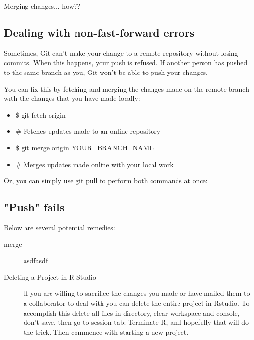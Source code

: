 \documentclass[12pt]{../SOP3_beta}
\begin{document}
\NP Merging changes... how??

\subsection{Dealing with non-fast-forward errors}

\NP Sometimes, Git can't make your change to a remote repository without losing commits. When this happens, your push is refused. If another person has pushed to the same branch as you, Git won't be able to push your changes.

\NP You can fix this by fetching and merging the changes made on the remote branch with the changes that you have made locally:
\begin{itemize}
  \item \$ git fetch origin
  \item \# Fetches updates made to an online repository
  \item \$ git merge origin YOUR\_BRANCH\_NAME
  \item \# Merges updates made online with your local work
\end{itemize}

\NP Or, you can simply use git pull to perform both commands at once:


\subsection{"Push" fails}

\NP Below are several potential remedies:

\begin{description}
  \item[merge] asdfasdf
  
  \item[Deleting a Project in R Studio]If you are willing to sacrifice the changes you made or have mailed them to a collaborator to deal with you can delete the entire project in Rstudio. To accomplish this delete all files in directory, clear workspace and console, don't save, then go to session tab: Terminate R, and hopefully that will do the trick. Then commence with starting a new project. 

\end{description}

\end{document}
